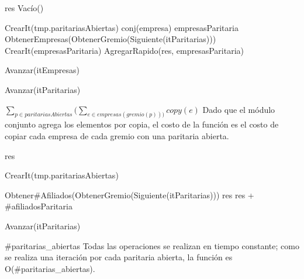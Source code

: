 {
	\state res \asig Vac\'io()		
	\state

	\state {} \asig CrearIt(tmp.paritariasAbiertas)		
							
		\state
		\state conj(empresa) empresasParitaria \asig ObtenerEmpresas(ObtenerGremio(Siguiente(itParitarias)))		
		\state
		\state {} \asig CrearIt(empresasParitaria)	
			
			\state
			\state AgregarRapido(res, empresasParitaria)	
			
			\state
			\state Avanzar(itEmpresas)	
		\endwhile

		\state
		\state Avanzar(itParitarias)						
	\endwhile
}
{ \ensuremath{\sum_{p \in paritariasAbiertas} (\sum_{e \in empresas(gremio(p)))} copy(e)} }
{ Dado que el m\'odulo conjunto agrega los elementos por copia, el costo de la funci\'on es el costo de copiar cada empresa de cada gremio con una paritaria abierta. }

{
	\state res 		
	\state

	\state {} \asig CrearIt(tmp.paritariasAbiertas)		
						
		\state

		\state {} \asig Obtener\#Afiliados(ObtenerGremio(Siguiente(itParitarias)))		
		\state res \asig res + \#afiliadosParitaria		

		\state
		\state Avanzar(itParitarias)					
	\endwhile
}
{ \#paritarias\_abiertas }
{ Todas las operaciones se realizan en tiempo constante; como se realiza una iteraci\'on por cada paritaria abierta, la funci\'on es O(\#paritarias\_abiertas). }

